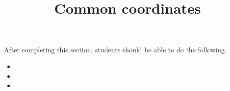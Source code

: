 \documentclass{ximera}
\title{Common coordinates}
\begin{document}
\begin{abstract}
\end{abstract}
\maketitle

\begin{sectionOutcomes}

After completing this section, students should be able to do the following.

\begin{itemize}
\item 
\item 
\item 
\end{itemize}

\end{sectionOutcomes}
\end{document}
